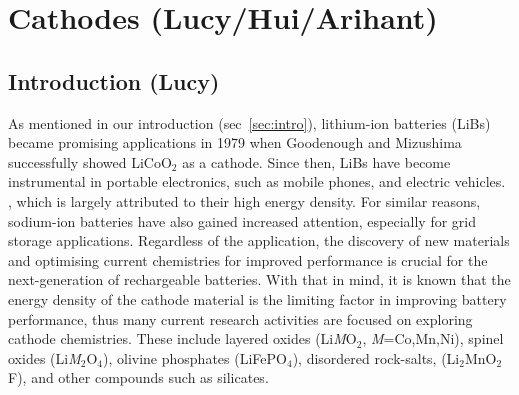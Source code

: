 \documentclass[../main.tex]{subfiles}
\begin{document}
\section{Cathodes (Lucy/Hui/Arihant)}
\label{sec:cathodes}

\subsection{Introduction (Lucy)}
\label{sec:cathode_intro}
As mentioned in our introduction (sec~\ref{sec:intro}), lithium-ion batteries (LiBs) became promising applications in 1979 when Goodenough and Mizushima successfully showed LiCoO$_2$ as a cathode.\cite{mizushima1980lixcoo2} Since then, LiBs have become instrumental in portable electronics, such as mobile phones, and electric vehicles. \cite{rozier2015li, whittingham2008materials, dunn2011electrical, liu2013materials,palacin2009recent}, which is largely attributed to their high energy density. \cite{masquelier2013polyanionic,armand2008building,bruce2012li,park2010review,scrosati2011lithium,goodenough_li-ion_2013,etacheri2011challenges,takada2013progress,fergus2010recent,ellis2010positive,he2012layered,zaghib2013review} For similar reasons, sodium-ion batteries have also gained increased attention, especially for grid storage applications. \cite{ellis2012curr,kim2012electrode,palomares2012ion,fergus2012ion,yabuuchi2012p2} Regardless of the application, the discovery of new materials and optimising current chemistries for improved performance is crucial for the next-generation of rechargeable batteries. With that in mind, it is known that the energy density of the cathode material is the limiting factor in improving battery performance, thus many current research activities are focused on exploring cathode chemistries. These include layered oxides (Li\textit{M}O$_2$, \textit{M}=Co,Mn,Ni), spinel oxides (Li\textit{M}$_2$O$_4$), olivine phosphates (LiFePO$_4$), disordered rock-salts, (Li$_2$MnO$_2$F), and other compounds such as silicates. \cite{daniel2014cathode, islam2014lithium}
\end{document}
